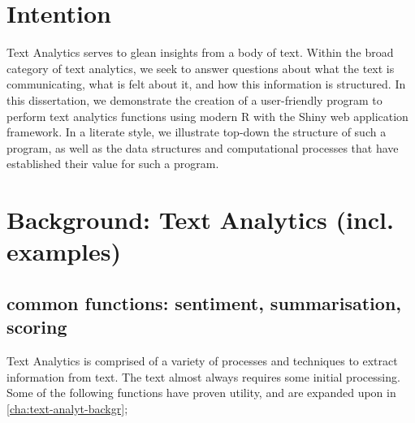 \documentclass[11pt, a4paper, oneside]{report}
\begin{document}
\section{Intention}
\label{sec:intention}

Text Analytics serves to glean insights from a body of text. Within the
broad category of text analytics, we seek to answer questions about
what the text is communicating, what is felt about it, and how this
information is structured. In this dissertation, we demonstrate the
creation of a user-friendly program to perform text analytics
functions using modern R with the Shiny web application framework. In
a literate style, we illustrate top-down the structure of such a
program, as well as the data structures and computational processes
that have established their value for such a program.
  
\section{Background: Text Analytics (incl. examples)}
\label{sec:backgr-text-analyt}
\subsection{common functions: sentiment, summarisation, scoring}
Text Analytics is comprised of a variety of processes and techniques
to extract information from text. The text almost always requires some
initial processing. Some of the following functions have proven
utility, and are expanded upon in \autoref{cha:text-analyt-backgr};
\end{document}
